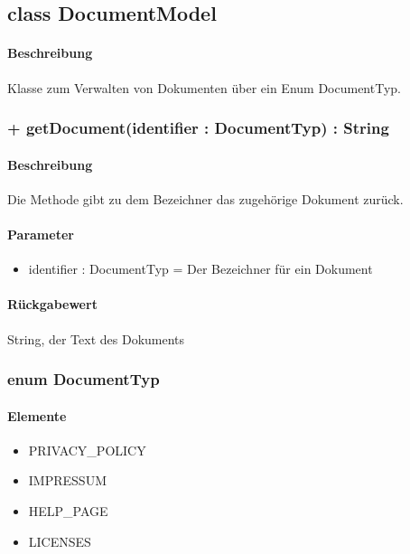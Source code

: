 \subsection{class DocumentModel}
\paragraph*{Beschreibung}
Klasse zum Verwalten von Dokumenten über ein Enum DocumentTyp.

\subsubsection{+ getDocument(identifier : DocumentTyp) : String}%
\paragraph*{Beschreibung}
Die Methode gibt zu dem Bezeichner das zugehörige Dokument zurück.
\paragraph*{Parameter}
\begin{itemize}
    \item identifier : DocumentTyp = Der Bezeichner für ein Dokument
\end{itemize}
\paragraph*{Rückgabewert}
String, der Text des Dokuments


\subsubsection{enum DocumentTyp}
\paragraph*{Elemente}
\begin{itemize}
    \item PRIVACY_POLICY
    \item IMPRESSUM
    \item HELP_PAGE
    \item LICENSES
\end{itemize}